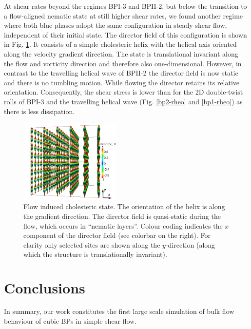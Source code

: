\documentclass[8.5pt,twoside,twocolumn]{article}
\begin{document}
At shear rates beyond the regimes BPI-3 and BPII-2, but below the transition to a 
flow-aligned nematic state at still higher shear rates, we found another regime where 
both blue phases adopt the same configuration in steady shear flow, 
independent of their initial state.
The director field of this configuration is shown in Fig. \ref{fig:cholflow}.
It consists of a simple cholesteric helix with the helical axis oriented 
along the velocity gradient direction. The state is translational invariant 
along the flow and vorticity direction and therefore also one-dimensional. 
However, in contrast to the travelling helical wave of BPII-2 the 
director field is now static and there is no tumbling motion. 
While flowing the director retains its relative orientation.
Consequently, the shear stress is lower than for
the 2D double-twist rolls of BPI-3 and the travelling helical wave
(Fig. \ref{bp2-rheo} and \ref{bp1-rheo}) as there is less dissipation.
 
\begin{figure}[htpb]
\includegraphics[width=0.45\textwidth]{dir3d+y-200k_run1179.png}
\caption{Flow induced cholesteric state. The orientation of the helix is 
along the gradient direction. The director field is quasi-static during 
the flow, which occurs in ``nematic layers''. Colour coding indicates the 
$x$ component of the director field (see colorbar on the right).
For clarity only selected sites are shown along the $y$-direction (along which
the structure is translationally invariant).}
\label{fig:cholflow}
\end{figure}




\section{Conclusions}

In summary, our work constitutes the first large scale simulation of bulk flow behaviour 
of cubic BPs in simple shear flow. 
  
\end{document}
